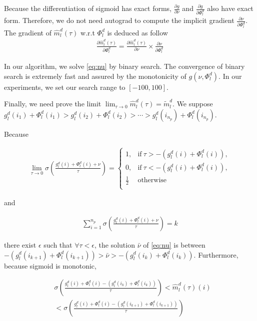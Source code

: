 \documentclass[11pt]{article}
\begin{document}
Because the differentiation of sigmoid has exact forms, $\frac{\partial g}{\partial \nu}$ and $\frac{\partial g}{\partial \Phi_l^d}$ also have exact form. Therefore, we do not need autograd to compute the implicit gradient $\frac{\partial \nu}{\partial \Phi_l^d}$. The gradient of $\hat{m}_l^d(\tau)$ w.r.t $\Phi_l^d$ is deduced as follow
\begin{align}
\frac{\partial \hat{m}_l^d(\tau)}{\partial \Phi_l^d} = \frac{\partial \hat{m}_l^d(\tau)}{\partial \nu} \times \frac{\partial \nu}{\partial \Phi_l^d}
\end{align}

In our algorithm, we solve \eqref{eq:nu} by binary search. The convergence of binary search is extremely fast and assured by the monotonicity of $g(\nu,\Phi_l^d)$. In our experiments, we set our search range to $[-100,100]$.

Finally, we need prove the limit $\lim_{\tau \rightarrow 0}\hat{m}_l^d(\tau) = \tilde{m}_l^d$. We suppose $g_l^d(i_1) + \Phi_l^d(i_1) > g_l^d(i_2) + \Phi_l^d(i_2) > \cdots > g_l^d(i_{n_p}) + \Phi_l^d(i_{n_p})$.

Because

\begin{align*}
\lim_{\tau \rightarrow 0} \sigma(\frac{g_l^d(i) + \Phi_l^d(i) + \nu}{\tau}) = \begin{cases}
      1, & \text{if}\ \tau > - (g_l^d(i) + \Phi_l^d(i)), \\
      0, & \text{if}\ \tau < - (g_l^d(i) + \Phi_l^d(i)), \\
      \frac{1}{2} &\text{otherwise}\\
    \end{cases}
\end{align*}

and 

\begin{align*}
\displaystyle{\mathop{\sum}_{i=1}^{n_p}} \sigma(\frac{g_l^d(i) + \Phi_l^d(i) + \nu}{\tau}) = k
\end{align*}

there exist $\epsilon$ such that $\forall \tau < \epsilon$, the solution $\bar{\nu}$ of \eqref{eq:nu} is between $- (g_l^d(i_{k+1}) + \Phi_l^d(i_{k+1})) > \bar{\nu} > - (g_l^d(i_k) + \Phi_l^d(i_k))$. Furthermore, because sigmoid is monotonic,

\begin{align*}
&\sigma(\frac{g_l^d(i) + \Phi_l^d(i) - (g_l^d(i_{k}) + \Phi_l^d(i_{k}))}{\tau}) < \hat{m}_l^d(\tau)(i)  \\
& < \sigma(\frac{g_l^d(i) + \Phi_l^d(i) - (g_l^d(i_{k+1}) + \Phi_l^d(i_{k+1}))}{\tau}) 
\end{align*}
\end{document}
